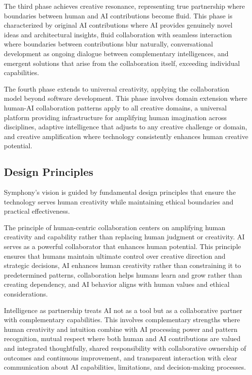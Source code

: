 The third phase achieves creative resonance, representing true partnership where boundaries between human and AI contributions become fluid. This phase is characterized by original AI contributions where AI provides genuinely novel ideas and architectural insights, fluid collaboration with seamless interaction where boundaries between contributions blur naturally, conversational development as ongoing dialogue between complementary intelligences, and emergent solutions that arise from the collaboration itself, exceeding individual capabilities.

The fourth phase extends to universal creativity, applying the collaboration model beyond software development. This phase involves domain extension where human-AI collaboration patterns apply to all creative domains, a universal platform providing infrastructure for amplifying human imagination across disciplines, adaptive intelligence that adjusts to any creative challenge or domain, and creative amplification where technology consistently enhances human creative potential.

\subsection{Design Principles}

Symphony's vision is guided by fundamental design principles that ensure the technology serves human creativity while maintaining ethical boundaries and practical effectiveness.

The principle of human-centric collaboration centers on amplifying human creativity and capability rather than replacing human judgment or creativity. AI serves as a powerful collaborator that enhances human potential. This principle ensures that humans maintain ultimate control over creative direction and strategic decisions, AI enhances human creativity rather than constraining it to predetermined patterns, collaboration helps humans learn and grow rather than creating dependency, and AI behavior aligns with human values and ethical considerations.

Intelligence as partnership treats AI not as a tool but as a collaborative partner with complementary capabilities. This involves complementary strengths where human creativity and intuition combine with AI processing power and pattern recognition, mutual respect where both human and AI contributions are valued and integrated thoughtfully, shared responsibility with collaborative ownership of outcomes and continuous improvement, and transparent interaction with clear communication about AI capabilities, limitations, and decision-making processes.

